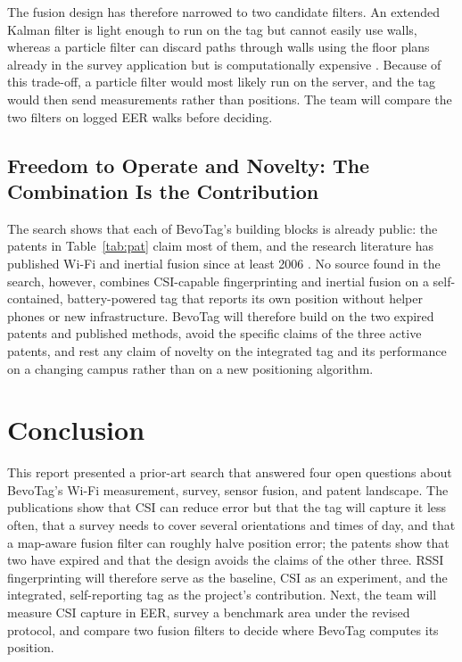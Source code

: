 \documentclass[12pt,letterpaper]{article}
\begin{document}
The fusion design has therefore narrowed to two candidate filters. An extended Kalman filter
\cite{welch} is light enough to run on the tag but cannot easily use walls, whereas a particle
filter can discard paths through walls using the floor plans already in the survey application but
is computationally expensive \cite{evennou}. Because of this trade-off, a particle filter would
most likely run on the server, and the tag would then send measurements rather than positions. The
team will compare the two filters on logged EER walks before deciding.

\subsection{Freedom to Operate and Novelty: The Combination Is the Contribution}
The search shows that each of BevoTag's building blocks is already public: the patents in
Table~\ref{tab:pat} claim most of them, and the research literature has published Wi-Fi and inertial
fusion since at least 2006 \cite{evennou}. No source found in the search, however, combines
CSI-capable fingerprinting and inertial fusion on a self-contained, battery-powered tag that reports
its own position without helper phones or new infrastructure. BevoTag will therefore build on the
two expired patents and published methods, avoid the specific claims of the three active patents,
and rest any claim of novelty on the integrated tag and its performance on a changing campus rather
than on a new positioning algorithm.

\section{Conclusion}
This report presented a prior-art search that answered four open questions about BevoTag's Wi-Fi
measurement, survey, sensor fusion, and patent landscape. The publications show that CSI can reduce
error but that the tag will capture it less often, that a survey needs to cover several
orientations and times of day, and that a map-aware fusion filter can roughly halve position error;
the patents show that two have expired and that the design avoids the claims of the other three. RSSI fingerprinting will therefore serve as the baseline, CSI as an experiment, and the
integrated, self-reporting tag as the project's contribution. Next, the team will measure CSI
capture in EER, survey a benchmark area under the revised protocol, and compare two fusion filters
to decide where BevoTag computes its position.
\end{document}
